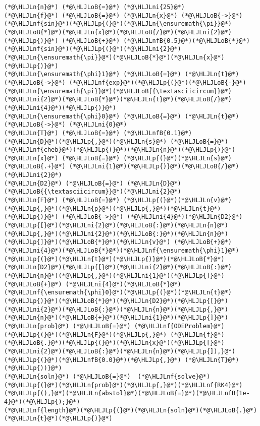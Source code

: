 \documentclass[12pt,landscape]{article}
\newcommand{\HLJLn}[1]{#1}
\newcommand{\HLJLnf}[1]{\textcolor[RGB]{66,102,213}{#1}}
\newcommand{\HLJLnfB}[1]{\textcolor[RGB]{59,151,46}{#1}}
\newcommand{\HLJLni}[1]{\textcolor[RGB]{59,151,46}{#1}}
\newcommand{\HLJLoB}[1]{\textcolor[RGB]{102,102,102}{\textbf{#1}}}
\newcommand{\HLJLp}[1]{#1}
\begin{document}
{\begin{lstlisting}
(*@\HLJLn{n}@*) (*@\HLJLoB{=}@*) (*@\HLJLni{25}@*)
(*@\HLJLn{f}@*) (*@\HLJLoB{=}@*) (*@\HLJLn{x}@*) (*@\HLJLoB{->}@*) (*@\HLJLnf{sin}@*)(*@\HLJLp{(}@*)(*@\HLJLn{\ensuremath{\pi}}@*)(*@\HLJLoB{*}@*)(*@\HLJLn{x}@*)(*@\HLJLoB{/}@*)(*@\HLJLni{2}@*)(*@\HLJLp{)}@*) (*@\HLJLoB{+}@*) (*@\HLJLnfB{0.5}@*)(*@\HLJLoB{*}@*)(*@\HLJLnf{sin}@*)(*@\HLJLp{(}@*)(*@\HLJLni{2}@*)(*@\HLJLn{\ensuremath{\pi}}@*)(*@\HLJLoB{*}@*)(*@\HLJLn{x}@*)(*@\HLJLp{)}@*)
(*@\HLJLn{\ensuremath{\phi}1}@*) (*@\HLJLoB{=}@*) (*@\HLJLn{t}@*) (*@\HLJLoB{->}@*) (*@\HLJLnf{exp}@*)(*@\HLJLp{(}@*)(*@\HLJLoB{-}@*)(*@\HLJLn{\ensuremath{\pi}}@*)(*@\HLJLoB{{\textasciicircum}}@*)(*@\HLJLni{2}@*)(*@\HLJLoB{*}@*)(*@\HLJLn{t}@*)(*@\HLJLoB{/}@*)(*@\HLJLni{4}@*)(*@\HLJLp{)}@*)
(*@\HLJLn{\ensuremath{\phi}0}@*) (*@\HLJLoB{=}@*) (*@\HLJLn{t}@*) (*@\HLJLoB{->}@*) (*@\HLJLni{0}@*)
(*@\HLJLn{T}@*) (*@\HLJLoB{=}@*) (*@\HLJLnfB{0.1}@*)
(*@\HLJLn{D}@*)(*@\HLJLp{,}@*)(*@\HLJLn{s}@*) (*@\HLJLoB{=}@*) (*@\HLJLnf{cheb}@*)(*@\HLJLp{(}@*)(*@\HLJLn{n}@*)(*@\HLJLp{)}@*)
(*@\HLJLn{x}@*) (*@\HLJLoB{=}@*) (*@\HLJLp{(}@*)(*@\HLJLn{s}@*) (*@\HLJLoB{.+}@*) (*@\HLJLni{1}@*)(*@\HLJLp{)}@*)(*@\HLJLoB{/}@*)(*@\HLJLni{2}@*)
(*@\HLJLn{D2}@*) (*@\HLJLoB{=}@*) (*@\HLJLn{D}@*)(*@\HLJLoB{{\textasciicircum}}@*)(*@\HLJLni{2}@*)
(*@\HLJLn{F}@*) (*@\HLJLoB{=}@*) (*@\HLJLp{(}@*)(*@\HLJLn{v}@*)(*@\HLJLp{,}@*)(*@\HLJLn{p}@*)(*@\HLJLp{,}@*)(*@\HLJLn{t}@*)(*@\HLJLp{)}@*) (*@\HLJLoB{->}@*) (*@\HLJLni{4}@*)(*@\HLJLn{D2}@*)(*@\HLJLp{[}@*)(*@\HLJLni{2}@*)(*@\HLJLoB{:}@*)(*@\HLJLn{n}@*)(*@\HLJLp{,}@*)(*@\HLJLni{2}@*)(*@\HLJLoB{:}@*)(*@\HLJLn{n}@*)(*@\HLJLp{]}@*)(*@\HLJLoB{*}@*)(*@\HLJLn{v}@*) (*@\HLJLoB{+}@*) (*@\HLJLni{4}@*)(*@\HLJLoB{*}@*)(*@\HLJLnf{\ensuremath{\phi}1}@*)(*@\HLJLp{(}@*)(*@\HLJLn{t}@*)(*@\HLJLp{)}@*)(*@\HLJLoB{*}@*)(*@\HLJLn{D2}@*)(*@\HLJLp{[}@*)(*@\HLJLni{2}@*)(*@\HLJLoB{:}@*)(*@\HLJLn{n}@*)(*@\HLJLp{,}@*)(*@\HLJLni{1}@*)(*@\HLJLp{]}@*) (*@\HLJLoB{+}@*) (*@\HLJLni{4}@*)(*@\HLJLoB{*}@*)(*@\HLJLnf{\ensuremath{\phi}0}@*)(*@\HLJLp{(}@*)(*@\HLJLn{t}@*)(*@\HLJLp{)}@*)(*@\HLJLoB{*}@*)(*@\HLJLn{D2}@*)(*@\HLJLp{[}@*)(*@\HLJLni{2}@*)(*@\HLJLoB{:}@*)(*@\HLJLn{n}@*)(*@\HLJLp{,}@*)(*@\HLJLn{n}@*)(*@\HLJLoB{+}@*)(*@\HLJLni{1}@*)(*@\HLJLp{]}@*)
(*@\HLJLn{prob}@*) (*@\HLJLoB{=}@*) (*@\HLJLnf{ODEProblem}@*)(*@\HLJLp{(}@*)(*@\HLJLn{F}@*)(*@\HLJLp{,}@*) (*@\HLJLn{f}@*)(*@\HLJLoB{.}@*)(*@\HLJLp{(}@*)(*@\HLJLn{x}@*)(*@\HLJLp{[}@*)(*@\HLJLni{2}@*)(*@\HLJLoB{:}@*)(*@\HLJLn{n}@*)(*@\HLJLp{]),}@*) (*@\HLJLp{(}@*)(*@\HLJLnfB{0.0}@*)(*@\HLJLp{,}@*) (*@\HLJLn{T}@*)(*@\HLJLp{))}@*)
(*@\HLJLn{soln}@*) (*@\HLJLoB{=}@*)  (*@\HLJLnf{solve}@*)(*@\HLJLp{(}@*)(*@\HLJLn{prob}@*)(*@\HLJLp{,}@*)(*@\HLJLnf{RK4}@*)(*@\HLJLp{(),}@*)(*@\HLJLn{abstol}@*)(*@\HLJLoB{=}@*)(*@\HLJLnfB{1e-4}@*)(*@\HLJLp{);}@*)
(*@\HLJLnf{length}@*)(*@\HLJLp{(}@*)(*@\HLJLn{soln}@*)(*@\HLJLoB{.}@*)(*@\HLJLn{t}@*)(*@\HLJLp{)}@*)
\end{lstlisting}

}
\end{document}
